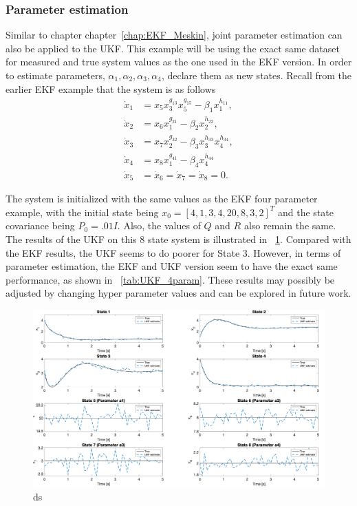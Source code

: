 

\clearpage
\subsubsection{Parameter estimation}

Similar to chapter chapter~\ref{chap:EKF_Meskin}, joint parameter estimation can also be applied to the UKF. This example will be using the exact same dataset for measured and true system values as the one used in the EKF version. In order to estimate parameters, $\alpha_1,\alpha_2, \alpha_3, \alpha_4$, declare them as new states. Recall from the earlier EKF example that the system is as follows
\begin{align*}
\dot x_1 &= x_5  x_3^{g_{13}} x_5^{g_{15}} - \beta_1 x_1^{h_{11}} , \\
\dot x_2 &= x_6  x_1^{g_{21}} - \beta_2 x_2^{h_{22}}, \\
\dot x_3 &= x_7  x_2^{g_{32}} - \beta_3 x_3^{h_{33}} x_4^{h_{34}}, \\
\dot x_4 &= x_8   x_1^{g_{41}} - \beta_4 x_4^{h_{44}} \\
\dot x_5 &= \dot x_6= \dot x_7 = \dot x_8 = 0.
\end{align*}

\noindent The system is initialized with the same values as the EKF four parameter example, with the initial state being $x_0 = [4, 1, 3, 4, 20, 8, 3, 2]^T$ and the state covariance being $P_0 = .01I$. Also, the values of $Q$ and $R$ also remain the same. The results of the UKF on this 8 state system is illustrated in ~\ref{fig:UKF_4param}. Compared with the EKF results, the UKF seems to do poorer for State 3. However, in terms of parameter estimation, the EKF and UKF version seem to have the exact same performance, as shown in ~\ref{tab:UKF_4param}. These results may possibly be adjusted by changing hyper parameter values and can be explored in future work.

\begin{figure}[h]
    \centering
    \includegraphics[scale = 0.5]{UKF_4param.png}
    \caption{ds}
    \label{fig:UKF_4param}
\end{figure}

